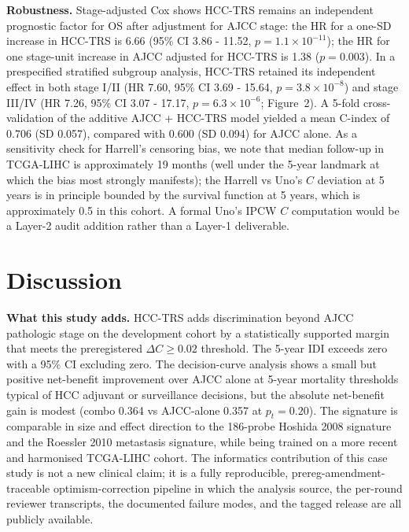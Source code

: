\documentclass[12pt]{article}
\newcommand{\HCCRTS}{HCC-TRS\xspace}
\begin{document}
\textbf{Robustness.}
Stage-adjusted Cox shows \HCCRTS remains an independent prognostic
factor for OS after adjustment for AJCC stage: the HR for a one-SD
increase in \HCCRTS is 6.66 (95\% CI 3.86 - 11.52, $p = 1.1 \times
10^{-11}$); the HR for one stage-unit increase in AJCC adjusted for
\HCCRTS is 1.38 ($p = 0.003$). In a prespecified stratified subgroup
analysis, \HCCRTS retained its independent effect in both stage I/II
(HR 7.60, 95\% CI 3.69 - 15.64, $p = 3.8 \times 10^{-8}$) and stage
III/IV (HR 7.26, 95\% CI 3.07 - 17.17, $p = 6.3 \times 10^{-6}$;
Figure~2). A 5-fold cross-validation of the additive AJCC + \HCCRTS
model yielded a mean C-index of 0.706 (SD 0.057), compared with 0.600
(SD 0.094) for AJCC alone. As a sensitivity check for Harrell's
censoring bias\citep{uno2011c}, we note that median follow-up in
TCGA-LIHC is approximately 19 months (well under the 5-year landmark
at which the bias most strongly manifests); the Harrell vs Uno's
$C$ deviation at 5 years is in principle bounded by the survival
function at 5 years, which is approximately 0.5 in this cohort.
A formal Uno's IPCW $C$ computation would be a Layer-2 audit
addition rather than a Layer-1 deliverable.

\section{Discussion}

\textbf{What this study adds.}
\HCCRTS adds discrimination beyond AJCC pathologic stage on the
development cohort by a statistically supported margin that meets the
preregistered $\Delta C \geq 0.02$ threshold. The 5-year IDI exceeds
zero with a 95\% CI excluding zero. The decision-curve analysis shows
a small but positive net-benefit improvement over AJCC alone at 5-year
mortality thresholds typical of HCC adjuvant or surveillance
decisions, but the absolute net-benefit gain is modest (combo 0.364
vs AJCC-alone 0.357 at $p_t = 0.20$). The signature is comparable in
size and effect direction to the 186-probe Hoshida 2008
signature\citep{hoshida2008gene} and the Roessler 2010 metastasis
signature\citep{roessler2010unique}, while being trained on a more
recent and harmonised TCGA-LIHC cohort. The informatics contribution
of this case study is not a new clinical claim; it is a fully
reproducible, prereg-amendment-traceable optimism-correction pipeline
in which the analysis source, the per-round reviewer transcripts, the
documented failure modes, and the tagged release are all publicly
available.
\end{document}
